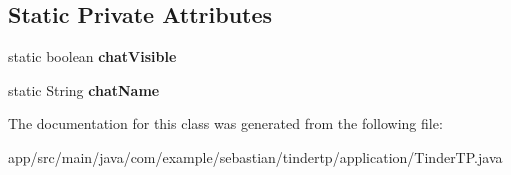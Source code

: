 \subsection*{Static Private Attributes}
\begin{DoxyCompactItemize}
\item 
static boolean {\bfseries chat\+Visible}\hypertarget{classcom_1_1example_1_1sebastian_1_1tindertp_1_1application_1_1TinderTP_ae4c10d298c3bbea64c2f0f35afd43ba1}{}\label{classcom_1_1example_1_1sebastian_1_1tindertp_1_1application_1_1TinderTP_ae4c10d298c3bbea64c2f0f35afd43ba1}

\item 
static String {\bfseries chat\+Name}\hypertarget{classcom_1_1example_1_1sebastian_1_1tindertp_1_1application_1_1TinderTP_a945206582c0d0a8672fe83d28e953c8a}{}\label{classcom_1_1example_1_1sebastian_1_1tindertp_1_1application_1_1TinderTP_a945206582c0d0a8672fe83d28e953c8a}

\end{DoxyCompactItemize}


The documentation for this class was generated from the following file\+:\begin{DoxyCompactItemize}
\item 
app/src/main/java/com/example/sebastian/tindertp/application/Tinder\+T\+P.\+java\end{DoxyCompactItemize}
